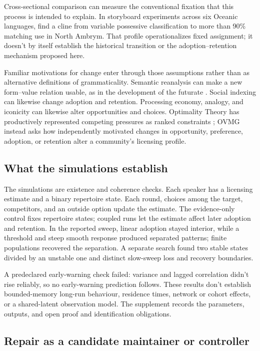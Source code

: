 Cross-sectional comparison can measure the conventional fixation that this
process is intended to explain. In storyboard experiments across six Oceanic
languages, \textcite{franjieh2025emergence} find a cline from variable
possessive classification to more than 90\% matching use in North Ambrym. That
profile operationalizes fixed assignment; it doesn't by itself establish the
historical transition or the adoption--retention mechanism proposed here.

Familiar motivations for change enter through those assumptions rather than as
alternative definitions of grammaticality. Semantic reanalysis can make a new
form--value relation usable, as in the development of the 
futurate \autocite{bybee1994}. Social indexing can likewise change adoption and
retention. Processing
economy, analogy, and iconicity can likewise alter opportunities and choices.
Optimality Theory has productively represented competing pressures as ranked
constraints \autocite{prince2004}; OVMG instead asks how independently motivated
changes in opportunity, preference, adoption, or retention alter a community's
licensing profile.

\subsection{What the simulations establish}
\label{sec:emergent-categoricality}

The simulations are existence and coherence checks. Each speaker has a licensing
estimate and a binary repertoire state. Each round, choices among the target,
competitors, and an outside option update the estimate. The evidence-only control
fixes repertoire states; coupled runs let the estimate affect later adoption and
retention. In the reported sweep, linear adoption stayed interior, while a
threshold and steep smooth response produced separated patterns; finite
populations recovered the separation. A separate search found two stable states
divided by an unstable one and distinct slow-sweep loss and recovery boundaries.

A predeclared early-warning check failed: variance and lagged correlation didn't
rise reliably, so no early-warning prediction follows. These results don't
establish bounded-memory long-run behaviour, residence times, network or cohort
effects, or a shared-latent observation model. The supplement records the
parameters, outputs, and open proof and identification obligations.

\subsection{Repair as a candidate maintainer or controller}
\label{sec:repair-controller}

